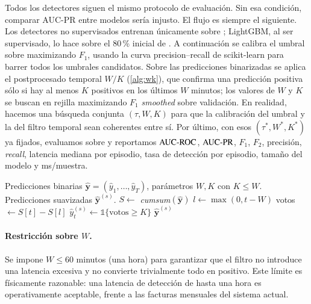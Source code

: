 Todos los detectores siguen el mismo protocolo de evaluación. Sin esa condición, comparar AUC-PR entre modelos sería injusto. El flujo es siempre el siguiente. Los detectores no supervisados entrenan únicamente sobre ; LightGBM, al ser supervisado, lo hace sobre el 80\,\% inicial de . A continuación se calibra el umbral sobre  maximizando $F_1$, usando la curva precision--recall de scikit-learn para barrer todos los umbrales candidatos. Sobre las predicciones binarizadas se aplica el postprocesado temporal $W/K$ (\cref{alg:wk}), que confirma una predicción positiva sólo si hay al menos $K$ positivos en los últimos $W$ minutos; los valores de $W$ y $K$ se buscan en rejilla maximizando $F_1$ \emph{smoothed} sobre validación. En realidad, hacemos una búsqueda conjunta $(\tau, W, K)$ para que la calibración del umbral y la del filtro temporal sean coherentes entre sí. Por último, con esos $(\tau^*, W^*, K^*)$ ya fijados, evaluamos sobre  y reportamos $\text{AUC-ROC}$, $\text{AUC-PR}$, $F_1$, $F_2$, precisión, \textit{recall}, latencia mediana por episodio, tasa de detección por episodio, tamaño del modelo y ms/muestra.

\begin{algorithm}[H]
\caption{Postprocesado temporal por votación causal $W/K$.}
\label{alg:wk}
\begin{algorithmic}[1]
\Require Predicciones binarias $\hat{\bm y} = (\hat y_1, \ldots, \hat y_T)$, parámetros $W, K$ con $K \leq W$.
\Ensure Predicciones suavizadas $\hat{\bm y}^{(s)}$.
\State $S \gets$ \emph{cumsum}$(\hat{\bm y})$
  \State $l \gets \max(0, t - W)$
  \State votos $\gets S[t] - S[l]$
  \State $\hat y^{(s)}_t \gets \mathbb{1}\{\text{votos} \geq K\}$
\EndFor
\State \Return $\hat{\bm y}^{(s)}$
\end{algorithmic}
\end{algorithm}

\paragraph{Restricción sobre $W$.} Se impone $W \leq 60$ minutos (una hora) para garantizar que el filtro no introduce una latencia excesiva y no convierte trivialmente todo en positivo. Este límite es físicamente razonable: una latencia de detección de hasta una hora es operativamente aceptable, frente a las facturas mensuales del sistema actual.
